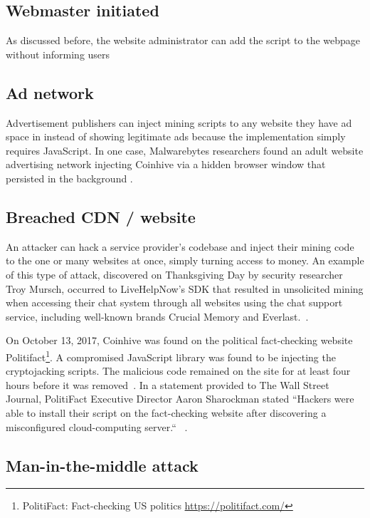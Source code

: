 \subsection{Webmaster initiated} 

As discussed before, the website administrator can add the script to the webpage without informing users

\subsection{Ad network} 

Advertisement publishers can inject mining scripts to any website they have ad space in instead of showing legitimate ads because the implementation simply requires JavaScript. In one case, Malwarebytes researchers found an adult website advertising network injecting Coinhive via a hidden browser window that persisted in the background \cite{malwarebytescoinhive}.

\subsection{Breached CDN / website} 
An attacker can hack a service provider's codebase and inject their mining code to the one or many websites at once, simply turning access to money. An example of this type of attack, discovered on Thanksgiving Day by security researcher Troy Mursch, occurred to LiveHelpNow's SDK that resulted in unsolicited mining when accessing their chat system through all websites using the chat support service, including well-known brands Crucial Memory and Everlast.~\cite{chatsupporthack}.

On October 13, 2017, Coinhive was found on the political fact-checking website Politifact\footnote{PolitiFact: Fact-checking US politics \url{https://politifact.com/}}. A compromised JavaScript library was found to be injecting the cryptojacking scripts. The malicious code remained on the site for at least four hours before it was removed~\cite{politifactcoinhive}. In a statement provided to The Wall Street Journal, PolitiFact Executive Director Aaron Sharockman stated ``Hackers were able to install their script on the fact-checking website after discovering a misconfigured cloud-computing server.`` ~\cite{politifactcoinhivewsj}.


\subsection{Man-in-the-middle attack} 

